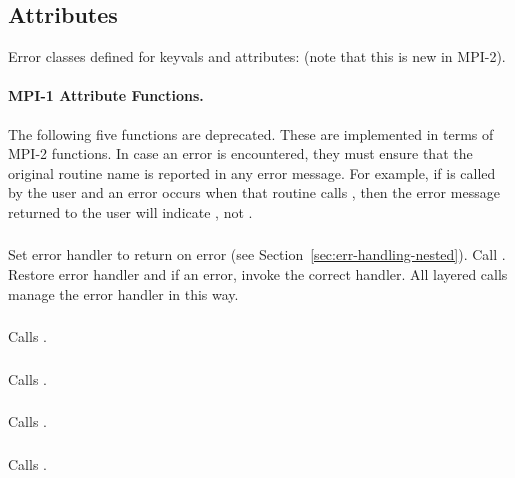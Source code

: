 \documentclass{article}
\begin{document}
\subsection{Attributes}
\label{sec:attr}

Error classes defined for keyvals and attributes:
 (note that this is new in MPI-2).


\paragraph{MPI-1 Attribute Functions.}
The following five functions are deprecated.  These are implemented in
terms of MPI-2 functions.  In case an error is encountered, they must 
ensure that the original routine name is reported in any error
message.  For example, if  is called by the
user and an error occurs when that routine calls
, then the error message returned to the
user will indicate , not
.

\subsubsection{}
\begin{adi3}
Set error handler to return on error (see
Section~\ref{sec:err-handling-nested}).
Call .
Restore error handler and if an error, invoke the correct handler.
All layered calls manage the error handler in this way.
\end{adi3}

\subsubsection{}
Calls .

\subsubsection{}
Calls .

\subsubsection{}
Calls .

\subsubsection{}
Calls .
\end{document}
